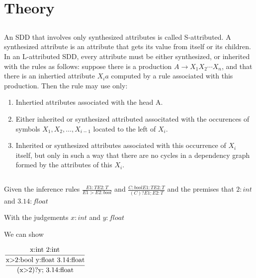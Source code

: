 \documentclass[a4paper]{article}
\date{}
\begin{document}
\thispagestyle{fancy}

\section{Theory}
\subsection{}

An SDD that involves only synthesized attributes is called S-attributed. A synthesized attribute is an attribute that gets its value from itself or its children. In an L-attributed SDD, every attribute must be either synthesized, or inherited with the rules as follows: suppose there is a production $A \rightarrow X_1X_2\cdots X_n$, and that there is an inhertied attribute $X_ia$ computed by a rule associated with this production. Then the rule may use only:

\begin{enumerate}
    \item Inhertied attributes associated with the head A.
    \item Either inherited or synthesized attributed associtated with the occurences of symbols $X_1, X_2,\ldots,X_{i-1}$ located to the left of $X_i$.
    \item Inherited or synthesized attributes associated with this occurrence of $X_i$ itself, but only in such a way that there are no cycles in a dependency graph formed by the attributes of this $X_i$.
\end{enumerate}

\subsection{}

Given the inference rules $\frac{E1:T E2:T}{E1 > E2:bool}$ and $\frac{C:bool E1:T E2:T}{(C)?E1;E2:T}$ and the premises that $2:int$ and $3.14:float$

With the judgements $x:int$ and $y:float$

We can show

$\cfrac{\text{x:int 2:int}}{\cfrac{\text{x>2:bool y:float 3.14:float}}{\text{(x>2)?y; 3.14:float}}}$
\end{document}
